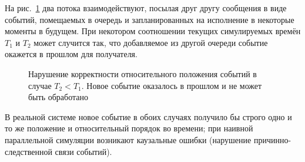 
На рис.~\ref{fig:two-queues-2} два потока взаимодействуют, посылая друг другу сообщения в виде событий, помещаемых в очередь и запланированных на исполнение в некоторые моменты в будущем. При некотором соотношении текущих симулируемых времён $T_1$ и $T_2$ может случится так, что добавляемое из другой очереди событие окажется в прошлом для получателя.

\begin{figure}[htbp]
	\centering
	\caption[Нарушение корректности относительного положения событий]{Нарушение корректности относительного положения событий в случае $T_2 < T_1$. Новое событие оказалось в прошлом и не может быть обработано}
	\label{fig:two-queues-2}
\end{figure}

В реальной системе новое событие в обоих случаях получило бы строго одно и то же положение и относительный порядок во времени; при наивной параллельной симуляции возникают каузальные ошибки (нарушение причинно-следственной связи событий).

